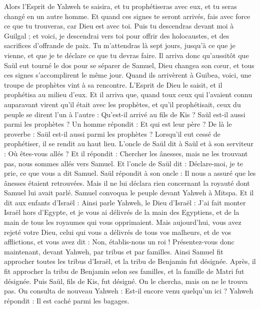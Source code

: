 \begin{multicols}{2}
Alors l'Esprit de Yahweh te saisira, et tu prophétiseras avec eux, et tu seras changé en un autre homme.
Et quand ces signes te seront arrivés, fais avec force ce que tu trouveras, car Dieu est avec toi.
Puis tu descendras devant moi à Guilgal ; et voici, je descendrai vers toi pour offrir des holocaustes, et des sacrifices d'offrande de paix. Tu m'attendras là sept jours, jusqu'à ce que je vienne, et que je te déclare ce que tu devras faire.
Il arriva donc qu'aussitôt que Saül eut tourné le dos pour se séparer de Samuel, Dieu changea son cœur, et tous ces signes s'accomplirent le même jour.
Quand ils arrivèrent à Guibea, voici, une troupe de prophètes vint à sa rencontre. L'Esprit de Dieu le saisit, et il prophétisa au milieu d'eux.
Et il arriva que, quand toux ceux qui l'avaient connu auparavant virent qu'il était avec les prophètes, et qu'il prophétisait, ceux du peuple se dirent l'un à l'autre : Qu'est-il arrivé au fils de Kis ? Saül est-il aussi parmi les prophètes ?
Un homme répondit : Et qui est leur père ? De là le proverbe : Saül est-il aussi parmi les prophètes ?
Lorsqu'il eut cessé de prophétiser, il se rendit au haut lieu.
L'oncle de Saül dit à Saül et à son serviteur : Où êtes-vous allés ? Et il répondit : Chercher les ânesses, mais ne les trouvant pas, nous sommes allés vers Samuel.
Et l'oncle de Saül dit : Déclare-moi, je te prie, ce que vous a dit Samuel.
Saül répondit à son oncle : Il nous a assuré que les ânesses étaient retrouvées. Mais il ne lui déclara rien concernant la royauté dont Samuel lui avait parlé.
Samuel convoqua le peuple devant Yahweh à Mitspa.
Et il dit aux enfants d'Israël : Ainsi parle Yahweh, le Dieu d'Israël : J'ai fait monter Israël hors d'Egypte, et je vous ai délivrés de la main des Egyptiens, et de la main de tous les royaumes qui vous opprimaient.
Mais aujourd'hui, vous avez rejeté votre Dieu, celui qui vous a délivrés de tous vos malheurs, et de vos afflictions, et vous avez dit : Non, établis-nous un roi ! Présentez-vous donc maintenant, devant Yahweh, par tribus et par familles.
Ainsi Samuel fit approcher toutes les tribus d'Israël, et la tribu de Benjamin fut désignée.
Après, il fit approcher la tribu de Benjamin selon ses familles, et la famille de Matri fut désignée. Puis Saül, fils de Kis, fut désigné. On le chercha, mais on ne le trouva pas.
On consulta de nouveau Yahweh : Est-il encore venu quelqu'un ici ? Yahweh répondit : Il est caché parmi les bagages.

\end{multicols}
